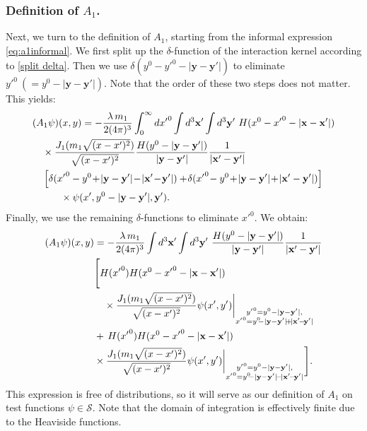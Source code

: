 \documentclass[b5paper,draft,openbib,12pt]{memoir}
\newcommand{\vx}{\mathbf{x}}
\newcommand{\vy}{\mathbf{y}}
\begin{document}
\subsubsection{Definition of $A_1$.}
Next, we turn to the definition of $A_1$, starting from the informal 
expression \eqref{eq:a1informal}. We first split up the 
$\delta$-function of the interaction kernel according to 
\eqref{split delta}.
Then we use $\delta(y^0-{y'}^0-|\vy-\vy'|)$ to eliminate 
${y'}^0~(=y^0-|\vy-\vy'|)$. Note that the order of these two steps 
does not matter. This yields:
\begin{align}
	&(A_1 \psi)(x,y) =  -\frac{\lambda \, m_1}{2(4 \pi)^3} \int_0^\infty d{x'}^0 \int d^3 \vx' \int d^3 \vy'~H(x^0-{x'}^0-|\vx-\vx'|)  \nonumber\\
& ~~~\times \frac{J_1(m_1\sqrt{(x-x')^2})}{\sqrt{(x-x')^2}} \frac{H(y^0-|\vy-\vy'|)}{|\vy-\vy'|} \frac{1}{|\vx'-\vy'|} \nonumber\\
&~~~\left[\delta({x'}^0 - y^0 \!+ \!|\vy-\vy'| \!-\! |\vx'\!-\!\vy'|)+ \! \delta({x'}^0 \!- y^0\! +\!|\vy-\vy'| \!+\! |\vx'-\vy'|) \right] \notag\\
&\hspace{1cm}\times\psi(x',y^0-|\vy-\vy'|,\vy').\label{eq:a1informal2}
\end{align}
Finally, we use the remaining $\delta$-functions to eliminate 
${x'}^0$. We obtain:
\begin{align}
	(A_1 \psi)(x,y) &=  -\frac{\lambda \, m_1}{2(4 \pi)^3} \int d^3 \vx' \int d^3 \vy'~\frac{H(y^0-|\vy-\vy'|)}{|\vy-\vy'|} \frac{1}{|\vx'-\vy'|} \nonumber\\
&\Bigg[ H({x'}^0)H(x^0-{x'}^0-|\vx-\vx'|)  \notag\\
& \quad \times\frac{J_1(m_1\sqrt{(x-x')^2})}{\sqrt{(x-x')^2}} \psi(x',y')\bigg|_{\substack{{y'}^0 = y^0-|\vy-\vy'|,\\{x'}^0 = y^0\!\!- |\vy-\vy'| \!+\! |\vx'\!-\!\vy'| }}\nonumber\\
&+ \, H({x'}^0)H(x^0-{x'}^0-|\vx-\vx'|)  \notag\\
&\times \frac{J_1(m_1\sqrt{(x-x')^2})}{\sqrt{(x-x')^2}} \psi(x',y')\bigg|_{\substack{{y'}^0 = y^0-|\vy-\vy'|,\\{x'}^0 = y^0\!\!- |\vy-\vy'| \!-\! |\vx'\!-\!\vy'| }} \Bigg] .\label{eq:defa1}
\end{align}
This expression is free of distributions, so it will serve as our 
definition of $A_1$ on test functions $\psi \in \mathcal{S}$. Note 
that the domain of integration is effectively finite due to the 
Heaviside functions.
\end{document}
